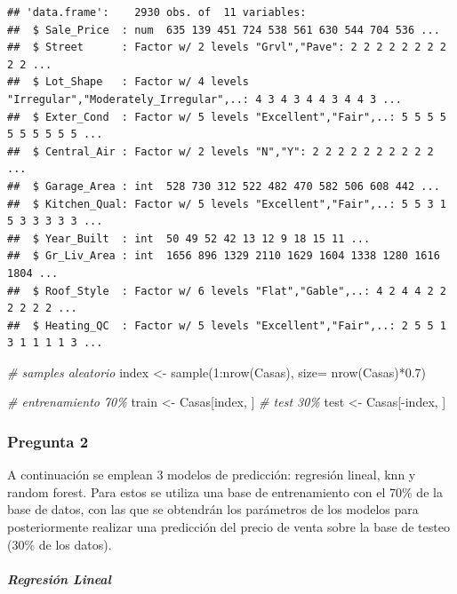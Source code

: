 \documentclass[
]{article}
\newenvironment{Shaded}{\begin{snugshade}}{\end{snugshade}}
\newcommand{\AttributeTok}[1]{\textcolor[rgb]{0.77,0.63,0.00}{#1}}
\newcommand{\CommentTok}[1]{\textcolor[rgb]{0.56,0.35,0.01}{\textit{#1}}}
\newcommand{\DecValTok}[1]{\textcolor[rgb]{0.00,0.00,0.81}{#1}}
\newcommand{\FloatTok}[1]{\textcolor[rgb]{0.00,0.00,0.81}{#1}}
\newcommand{\FunctionTok}[1]{\textcolor[rgb]{0.00,0.00,0.00}{#1}}
\newcommand{\NormalTok}[1]{#1}
\newcommand{\OtherTok}[1]{\textcolor[rgb]{0.56,0.35,0.01}{#1}}
\newcommand{\SpecialCharTok}[1]{\textcolor[rgb]{0.00,0.00,0.00}{#1}}
\begin{document}
\begin{verbatim}
## 'data.frame':    2930 obs. of  11 variables:
##  $ Sale_Price  : num  635 139 451 724 538 561 630 544 704 536 ...
##  $ Street      : Factor w/ 2 levels "Grvl","Pave": 2 2 2 2 2 2 2 2 2 2 ...
##  $ Lot_Shape   : Factor w/ 4 levels "Irregular","Moderately_Irregular",..: 4 3 4 3 4 4 3 4 4 3 ...
##  $ Exter_Cond  : Factor w/ 5 levels "Excellent","Fair",..: 5 5 5 5 5 5 5 5 5 5 ...
##  $ Central_Air : Factor w/ 2 levels "N","Y": 2 2 2 2 2 2 2 2 2 2 ...
##  $ Garage_Area : int  528 730 312 522 482 470 582 506 608 442 ...
##  $ Kitchen_Qual: Factor w/ 5 levels "Excellent","Fair",..: 5 5 3 1 5 3 3 3 3 3 ...
##  $ Year_Built  : int  50 49 52 42 13 12 9 18 15 11 ...
##  $ Gr_Liv_Area : int  1656 896 1329 2110 1629 1604 1338 1280 1616 1804 ...
##  $ Roof_Style  : Factor w/ 6 levels "Flat","Gable",..: 4 2 4 4 2 2 2 2 2 2 ...
##  $ Heating_QC  : Factor w/ 5 levels "Excellent","Fair",..: 2 5 5 1 3 1 1 1 1 3 ...
\end{verbatim}

\begin{Shaded}
\begin{Highlighting}[]
\CommentTok{\# samples aleatorio}
\NormalTok{index }\OtherTok{\textless{}{-}} \FunctionTok{sample}\NormalTok{(}\DecValTok{1}\SpecialCharTok{:}\FunctionTok{nrow}\NormalTok{(Casas), }\AttributeTok{size=} \FunctionTok{nrow}\NormalTok{(Casas)}\SpecialCharTok{*}\FloatTok{0.7}\NormalTok{)}

\CommentTok{\# entrenamiento 70\%}
\NormalTok{train }\OtherTok{\textless{}{-}}\NormalTok{ Casas[index, ]}
\CommentTok{\# test 30\%}
\NormalTok{test  }\OtherTok{\textless{}{-}}\NormalTok{ Casas[}\SpecialCharTok{{-}}\NormalTok{index, ]}
\end{Highlighting}
\end{Shaded}

\hypertarget{pregunta-2}{%
\subsubsection{Pregunta 2}\label{pregunta-2}}

A continuación se emplean 3 modelos de predicción: regresión lineal, knn
y random forest. Para estos se utiliza una base de entrenamiento con el
70\% de la base de datos, con las que se obtendrán los parámetros de los
modelos para posteriormente realizar una predicción del precio de venta
sobre la base de testeo (30\% de los datos).

\hypertarget{regresiuxf3n-lineal-1}{%
\subparagraph{Regresión Lineal}\label{regresiuxf3n-lineal-1}}
\end{document}
